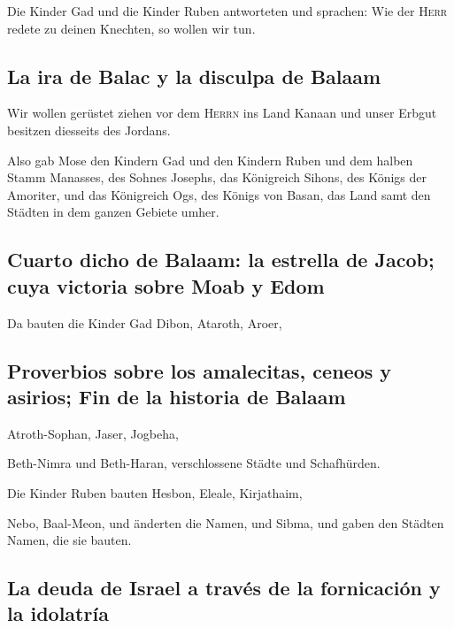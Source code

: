  Die Kinder Gad und die Kinder Ruben antworteten und
sprachen: Wie der \textsc{Herr} redete zu deinen Knechten, so wollen wir
tun.

\hypertarget{la-ira-de-balac-y-la-disculpa-de-balaam}{%
\subsection{La ira de Balac y la disculpa de
Balaam}\label{la-ira-de-balac-y-la-disculpa-de-balaam}}

 Wir wollen gerüstet ziehen vor dem \textsc{Herrn} ins
Land Kanaan und unser Erbgut besitzen diesseits des Jordans.

 Also gab Mose den Kindern Gad und den Kindern Ruben und
dem halben Stamm Manasses, des Sohnes Josephs, das Königreich Sihons,
des Königs der Amoriter, und das Königreich Ogs, des Königs von Basan,
das Land samt den Städten in dem ganzen Gebiete umher.

\hypertarget{cuarto-dicho-de-balaam-la-estrella-de-jacob-cuya-victoria-sobre-moab-y-edom}{%
\subsection{Cuarto dicho de Balaam: la estrella de Jacob; cuya victoria
sobre Moab y
Edom}\label{cuarto-dicho-de-balaam-la-estrella-de-jacob-cuya-victoria-sobre-moab-y-edom}}

 Da bauten die Kinder Gad Dibon, Ataroth, Aroer,

\hypertarget{proverbios-sobre-los-amalecitas-ceneos-y-asirios-fin-de-la-historia-de-balaam}{%
\subsection{Proverbios sobre los amalecitas, ceneos y asirios; Fin de la
historia de
Balaam}\label{proverbios-sobre-los-amalecitas-ceneos-y-asirios-fin-de-la-historia-de-balaam}}

 Atroth-Sophan, Jaser, Jogbeha,

 Beth-Nimra und Beth-Haran, verschlossene Städte und
Schafhürden.

 Die Kinder Ruben bauten Hesbon, Eleale, Kirjathaim,

 Nebo, Baal-Meon, und änderten die Namen, und Sibma, und
gaben den Städten Namen, die sie bauten.

\hypertarget{la-deuda-de-israel-a-travuxe9s-de-la-fornicaciuxf3n-y-la-idolatruxeda}{%
\subsection{La deuda de Israel a través de la fornicación y la
idolatría}\label{la-deuda-de-israel-a-travuxe9s-de-la-fornicaciuxf3n-y-la-idolatruxeda}}

